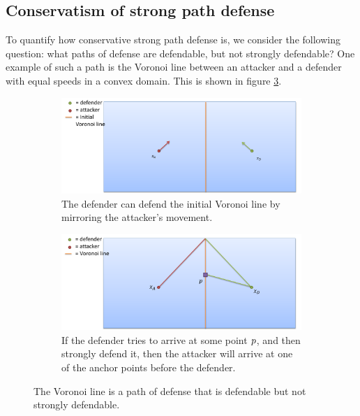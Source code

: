 \subsection{Conservatism of strong path defense \label{subsec:pd_cons}}
To quantify how conservative strong path defense is, we consider the following question: what paths of defense are defendable, but not strongly defendable? One example of such a path is the Voronoi line between an attacker and a defender with equal speeds in a convex domain. This is shown in figure \ref{fig:voronoi_pod}.

\begin{figure}[h]
\centering

\begin{subfigure}{0.45\textwidth}
\includegraphics[width=\textwidth]{"fig/defend voronoi"}
\caption{The defender can defend the initial Voronoi line by mirroring the attacker's movement.}
\label{subfig:vor_pod1}
\end{subfigure}

\begin{subfigure}{0.45\textwidth}
\includegraphics[width=\textwidth]{"fig/voronoi strong defense"}
\caption{If the defender tries to arrive at some point $p$, and then strongly defend it, then the attacker will arrive at one of the anchor points before the defender.}
\label{subfig:vor_pod2}
\end{subfigure}

\caption{The Voronoi line is a path of defense that is defendable but not strongly defendable.}
\label{fig:voronoi_pod}
\end{figure}

